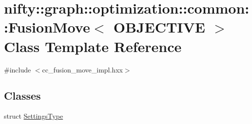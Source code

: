 \hypertarget{classnifty_1_1graph_1_1optimization_1_1common_1_1FusionMove}{}\section{nifty\+:\+:graph\+:\+:optimization\+:\+:common\+:\+:Fusion\+Move$<$ O\+B\+J\+E\+C\+T\+I\+V\+E $>$ Class Template Reference}
\label{classnifty_1_1graph_1_1optimization_1_1common_1_1FusionMove}


{\ttfamily \#include $<$cc\+\_\+fusion\+\_\+move\+\_\+impl.\+hxx$>$}

\subsection*{Classes}
\begin{DoxyCompactItemize}
\item 
struct \hyperlink{structnifty_1_1graph_1_1optimization_1_1common_1_1FusionMove_1_1SettingsType}{Settings\+Type}
\end{DoxyCompactItemize}

